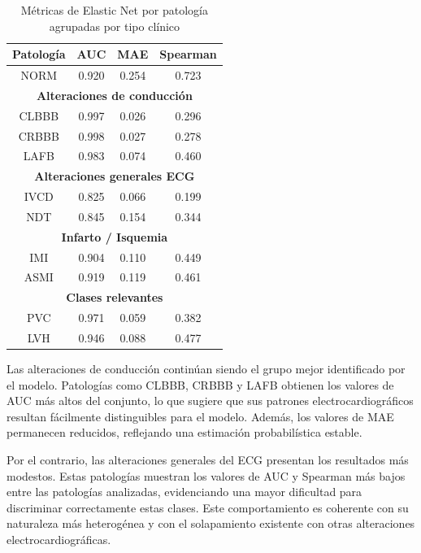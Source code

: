 \documentclass[12pt,a4paper,twoside]{book}
\begin{document}
\begin{table}[H]
	\centering
	\begin{tabular}{|c|c|c|c|}
	\hline

	\textbf{Patología} & \textbf{AUC} & \textbf{MAE} & \textbf{Spearman} \\
	\hline
	NORM & 0.920 & 0.254 & 0.723 \\
	\hline

	\multicolumn{4}{|c|}{\textbf{Alteraciones de conducción}} \\
	\hline
	CLBBB & 0.997 & 0.026 & 0.296 \\ 
	CRBBB & 0.998 & 0.027 & 0.278 \\ 
	LAFB  & 0.983 & 0.074 & 0.460 \\
	\hline

	\multicolumn{4}{|c|}{\textbf{Alteraciones generales ECG}} \\
	\hline
	IVCD  & 0.825 & 0.066 & 0.199 \\ 
	NDT   & 0.845 & 0.154 & 0.344 \\
	\hline

	\multicolumn{4}{|c|}{\textbf{Infarto / Isquemia}} \\
	\hline
	IMI   & 0.904 & 0.110 & 0.449 \\ 
	ASMI  & 0.919 & 0.119 & 0.461 \\
	\hline

	\multicolumn{4}{|c|}{\textbf{Clases relevantes}} \\
	\hline
	PVC   & 0.971 & 0.059 & 0.382 \\
	LVH   & 0.946 & 0.088 & 0.477 \\
	\hline

	\end{tabular}
	\caption{Métricas de Elastic Net por patología agrupadas por tipo clínico}
	\label{tab:metrics_grouped_en}
\end{table}

Las alteraciones de conducción continúan siendo el grupo mejor identificado por el modelo. 
Patologías como CLBBB, CRBBB y LAFB obtienen los valores de AUC más altos del conjunto, lo que sugiere que sus patrones electrocardiográficos resultan fácilmente distinguibles para el modelo. Además, los valores de MAE permanecen reducidos, reflejando una estimación probabilística estable.

Por el contrario, las alteraciones generales del ECG presentan los resultados más modestos. 
Estas patologías muestran los valores de AUC y Spearman más bajos entre las patologías analizadas, evidenciando una mayor dificultad para discriminar correctamente estas clases. 
Este comportamiento es coherente con su naturaleza más heterogénea y con el solapamiento existente con otras alteraciones electrocardiográficas.
\end{document}
